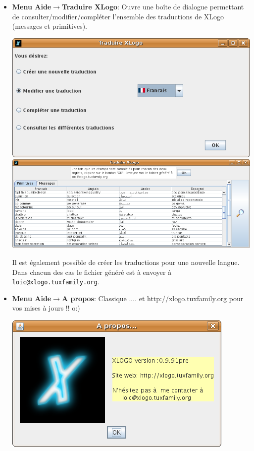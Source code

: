 \begin{itemize}
\item \textbf{Menu Aide$\to$Traduire XLogo}: Ouvre une boîte de dialogue permettant de consulter/modifier/compléter l'ensemble des traductions de XLogo (messages et primitives).\\
	\begin{center}
 		\includegraphics[scale=0.4]{images/CaptureXLogoTrad1.png}
 		\includegraphics[scale=0.4]{images/CaptureXLogoTrad2.png}
	\end{center}
	\vspace{0.25cm}
 Il est également possible de créer les traductions pour une nouvelle langue. Dans chacun des cas le fichier généré est à envoyer à \texttt{loic@xlogo.tuxfamily.org}.\\
\item \textbf{Menu Aide$\to$A propos}: Classique .... et http://xlogo.tuxfamily.org pour vos mises à jours !! o:)\\
	\begin{center}
 		\includegraphics[scale=0.6]{images/CaptureApropos.png}
	\end{center}
	\vspace{0.25cm}
\end{itemize}


